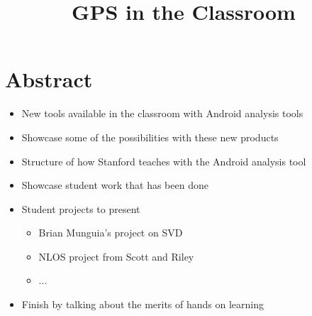 \documentclass[conference]{IEEEtran}
\begin{document}
\title{GPS in the Classroom}

\author{
\and
{}
\and
{}
\and
{}
}

\maketitle

\section*{Abstract}

\begin{itemize}
    \item New tools available in the classroom with Android analysis tools
    \item Showcase some of the possibilities with these new products
    \item Structure of how Stanford teaches with the Android analysis tool
    \item Showcase student work that has been done 
    \item Student projects to present
    \begin{itemize}
        \item Brian Munguia's project on SVD
        \item NLOS project from Scott and Riley
        \item ...
    \end{itemize}
    \item Finish by talking about the merits of hands on learning
\end{itemize}
\end{document}

